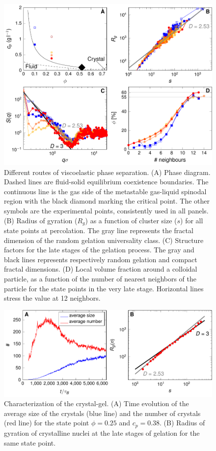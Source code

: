 \documentclass[12pt]{article}
\begin{document}
\clearpage

\begin{figure}[!t]
 \centering
 \includegraphics{phase_separation.pdf}
 \caption{Different routes of viscoelastic phase separation. 
(A) Phase diagram. Dashed lines are fluid-solid equilibrium coexistence boundaries. The continuous line is the gas side of the metastable gas-liquid spinodal region with the black diamond marking the critical point. The other symbols are the experimental points, consistently used in all panels.
(B) Radius of gyration ($R_g$) as a function of cluster size ($s$) for all state points at percolation. The
 gray line represents the fractal dimension of the random gelation universality class.
(C) Structure factors for the late stages of the gelation process. The gray and black lines represents respectively random gelation and compact fractal dimensions.
(D) Local volume fraction around a colloidal particle, as a function of the number of nearest neighbors of the particle for the state points in the very late stage. Horizontal lines stress the value at 12 neighbors.
 }
 \label{fig:phase_separation}
\end{figure}

\clearpage

\begin{figure}[!t]
 \centering
 \includegraphics{characterisation}
\caption{Characterization of the crystal-gel. (A) Time evolution of the average size of the crystals (blue line) and the number of crystals (red line) for the state point $\phi=0.25$ and $c_p=0.38$. (B) Radius of gyration of crystalline nuclei at the late stages of gelation for the same state point.} 
 \label{fig:crystals}
\end{figure}
\end{document}
